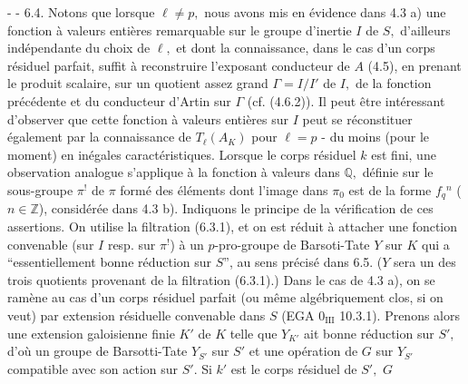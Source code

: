 -  -
6.4. Notons que lorsque \(\ell\neq p,\) nous avons mis en évidence dans 4.3 a) une fonction à valeurs entières remarquable sur le groupe d'inertie \(I\) de \(S,\) d'ailleurs indépendante du choix de \(\ell,\) et dont la connaissance, dans le cas d'un corps résiduel parfait, suffit à reconstruire l'exposant conducteur de \(A\) (4.5), en prenant le produit scalaire, sur un quotient assez grand \(\Gamma=I/I'\) de \(I,\) de la fonction précédente et du conducteur d'Artin sur \(\Gamma\) (cf. (4.6.2)). Il peut être intéressant d'observer que cette fonction à valeurs entières sur \(I\) peut se réconstituer également par la connaissance de \(T_\ell(A_K)\) pour \(\ell=p\) - du moins (pour le moment) en inégales caractéristiques. Lorsque le corps résiduel \(k\) est fini, une observation analogue s'applique à la fonction à valeurs dans \(\mathbb Q,\) définie sur le sous-groupe \(\pi^!\) de \(\pi\) formé des éléments dont l'image dans \(\pi_0\) est de la forme \(f_q{}^n\) (\(n\in\mathbb Z\)), considérée dans 4.3 b). Indiquons le principe de la vérification de ces assertions. On utilise la filtration (6.3.1), et on est réduit à attacher une fonction convenable (sur \(I\) resp. sur \(\pi^!\)) à un \(p\)-pro-groupe de Barsoti-Tate \(Y\) sur \(K\) qui a ``essentiellement bonne réduction sur \(S\)'', au sens précisé dans 6.5. (\(Y\) sera un des trois quotients provenant de la filtration (6.3.1).) Dans le cas de 4.3 a), on se ramène au cas d'un corps résiduel parfait (ou même algébriquement clos, si on veut) par extension résiduelle convenable dans \(S\) (EGA 0\(_{\mathrm{III}}\) 10.3.1). Prenons alors une extension galoisienne finie \(K'\) de \(K\) telle que \(Y_{K'}\) ait bonne réduction sur \(S',\) d'où un groupe de Barsotti-Tate \(Y_{S'}\) sur \(S'\) et une opération de \(G\) sur \(Y_{S'}\) compatible avec son action sur \(S'.\) Si \(k'\) est le corps résiduel de \(S',\) \(G\)
